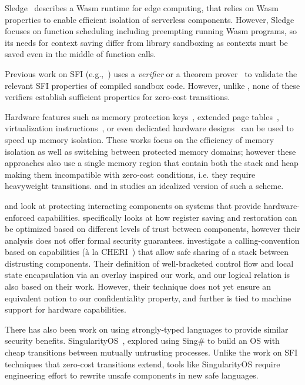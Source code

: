 Sledge~\cite{sledge} describes a Wasm runtime for edge computing, that
relies on Wasm properties to enable efficient isolation of serverless
components.
%
However, Sledge focuses on function
scheduling including preempting running Wasm programs,
so its needs for context saving differ from library sandboxing as
contexts must be saved even in the middle of function calls.

%
Previous work on SFI
(e.g.,~\cite{mccamant_evaluating_2006,yee_native_2009, xfi, veriwasm}) uses a
\emph{verifier} or a theorem prover~\cite{armor, compcert-sfi} to validate the
relevant SFI properties of compiled sandbox code.
%
However, unlike \verifname{}, none of these verifiers establish sufficient
properties for zero-cost transitions.

%
Hardware features such as memory protection
keys~\cite{vahldiek-oberwagner_erim_2019, hodor}, extended page
tables~\cite{qiang_libsec_2017}, virtualization
instructions~\cite{qiang_libsec_2017, dune}, or even dedicated hardware
designs~\cite{donky} can be used to speed up
memory isolation.
%
These works focus on the efficiency of memory isolation as well as switching
between protected memory domains; however these approaches also use a single memory region that contain both the stack and heap making them incompatible with zero-cost conditions, i.e. they require heavyweight transitions.
%
\tridealheavy and \tridealheavysixfour in  studies an idealized version of such a scheme.

%
\citet{karger} and \citet{skorstengaard_stktokens_2019} look at protecting
interacting components on systems that provide hardware-enforced capabilities.
%
\citet{karger} specifically looks at how register saving and restoration can be
optimized based on different levels of trust between components, however their
analysis does not offer formal security guarantees.
%
\citet{skorstengaard_stktokens_2019} investigate a calling-convention based on
capabilities (\`a la CHERI~\cite{cheri}) that allow safe sharing of a
stack between distrusting components.
%
Their definition of well-bracketed control flow and local state encapsulation
via an overlay inspired our work, and our logical relation is also based
on their work.
%
However, their technique does not yet ensure an equivalent notion to our
confidentiality property, and further is tied to machine support for hardware
capabilities.

%
There has also been work on using strongly-typed languages to provide similar
security benefits.
%
SingularityOS~\cite{aiken2006deconstructing, hunt2007singularity,
fahndrich2006language}, explored using Sing\# to build an OS with cheap
transitions between mutually untrusting processes.
%
Unlike the work on SFI techniques that zero-cost transitions extend, tools like
SingularityOS require engineering effort to rewrite unsafe components in new
safe languages.

